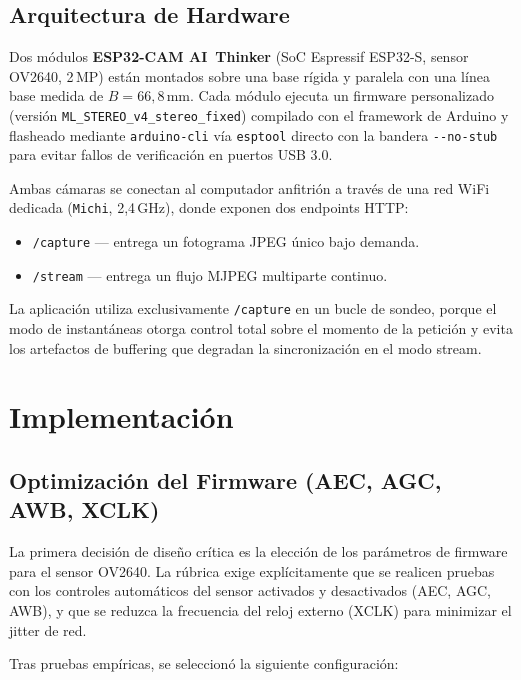 \documentclass[12pt, a4paper]{article}
\begin{document}
\subsection{Arquitectura de Hardware}

Dos módulos \textbf{ESP32-CAM AI~Thinker} (SoC Espressif ESP32-S, sensor OV2640,
2\,MP) están montados sobre una base rígida y paralela con una línea base medida de
$B = 66{,}8$\,mm. Cada módulo ejecuta un firmware personalizado (versión
\texttt{ML\_STEREO\_v4\_stereo\_fixed}) compilado con el framework de Arduino y flasheado
mediante \texttt{arduino-cli} vía \texttt{esptool} directo con la bandera
\texttt{-{-}no-stub} para evitar fallos de verificación en puertos USB 3.0.

Ambas cámaras se conectan al computador anfitrión a través de una red WiFi dedicada
(\texttt{Michi}, 2,4\,GHz), donde exponen dos endpoints HTTP:
\begin{itemize}[leftmargin=2em]
  \item \texttt{/capture} — entrega un fotograma JPEG único bajo demanda.
  \item \texttt{/stream}  — entrega un flujo MJPEG multiparte continuo.
\end{itemize}
La aplicación utiliza exclusivamente \texttt{/capture} en un bucle de sondeo, porque
el modo de instantáneas otorga control total sobre el momento de la petición y evita
los artefactos de buffering que degradan la sincronización en el modo stream.

\section{Implementación}

\subsection{Optimización del Firmware (AEC, AGC, AWB, XCLK)}

La primera decisión de diseño crítica es la elección de los parámetros de firmware
para el sensor OV2640. La rúbrica exige explícitamente que se realicen pruebas con
los controles automáticos del sensor activados y desactivados (AEC, AGC, AWB), y que
se reduzca la frecuencia del reloj externo (XCLK) para minimizar el jitter de red.

Tras pruebas empíricas, se seleccionó la siguiente configuración:
\end{document}
